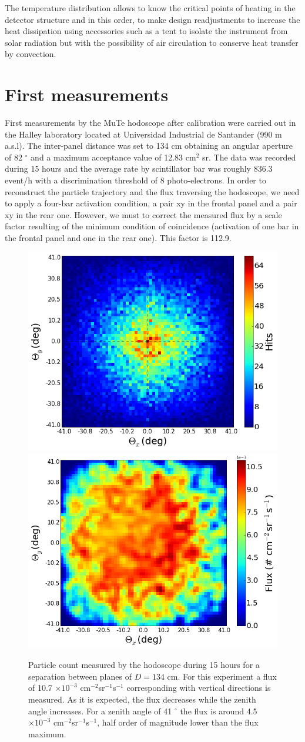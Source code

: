 \documentclass[letterpaper,11pt]{article}
\begin{document}
The temperature distribution allows to know the critical points of heating in the detector structure and in this order, to make design readjustments to increase the heat dissipation using accessories such as a tent to isolate the instrument from solar radiation but with the possibility of air circulation to conserve heat transfer by convection. 

\section{First measurements}

First measurements by the MuTe hodoscope after calibration were carried out in the Halley laboratory located at Universidad Industrial de Santander (990 m a.s.l). The inter-panel distance was set to 134 cm obtaining an angular aperture of 82 $^{\circ}$ and a maximum acceptance value of 12.83 cm$^{2}$ sr. The data was recorded during 15 hours and the average rate by scintillator bar was roughly 836.3 event/h with a discrimination threshold of 8 photo-electrons. In order to reconstruct the particle trajectory and the flux traversing the hodoscope, we need to apply a four-bar activation condition, a pair xy in the frontal panel and a pair xy in the rear one. However, we must to correct the measured flux by a scale factor resulting of the minimum condition of coincidence (activation of one bar in the frontal panel and one in the rear one). This factor is 112.9. 

\begin{figure}[htb]
\centering
\includegraphics[width=0.48\columnwidth]{Figures/Hits_15h.png}
\includegraphics[width=0.49\columnwidth]{Figures/Flux.png}
\caption{Particle count measured by the hodoscope during 15 hours for a separation between planes of $D=134$ cm. For this experiment a flux of 10.7 $\times 10^{-3}$ cm$^{-2}$sr$^{-1}$s$^{-1}$ corresponding with vertical directions is measured. As it is expected, the flux decreases while the zenith angle increases. For a zenith angle of 41 $^{\circ}$ the flux is around 4.5 $\times 10^{-3}$ cm$^{-2}$sr$^{-1}$s$^{-1}$, half order of magnitude lower than the flux maximum.}
\label{fig:hits_15}
\end{figure}
\end{document}
